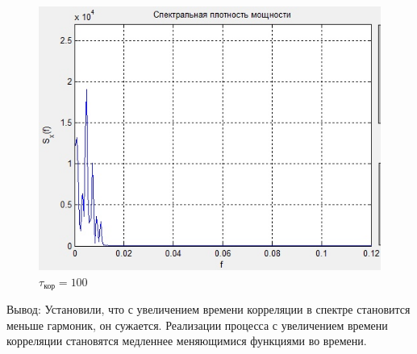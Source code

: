\begin{figure}[H]
\begin{minipage}{0.3\linewidth}
		\includegraphics[width=\linewidth]{tasks/task1/realize100_sp}
		\caption*{$\tau_\text{кор}=100$}
	\end{minipage}
\end{figure}
Вывод: Установили, что с увеличением времени корреляции в спектре становится меньше гармоник, он сужается. Реализации процесса с увеличением времени корреляции становятся медленнее меняющимися функциями во времени.

